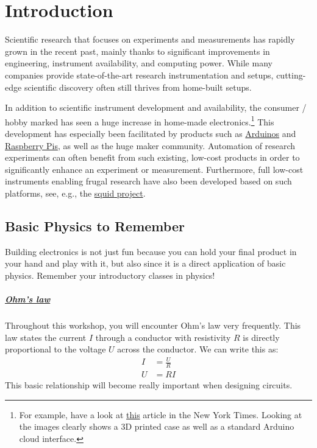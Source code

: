 
\chapter{Introduction}

Scientific research that focuses on experiments and measurements has rapidly grown in the recent past, mainly thanks to significant improvements in engineering, instrument availability, and computing power. While many companies provide state-of-the-art research instrumentation and setups, cutting-edge scientific discovery often still thrives from home-built setups. 

In addition to scientific instrument development and availability, the consumer / hobby marked has seen a huge increase in home-made electronics.\footnote{For example, have a look at \href{https://www.nytimes.com/2021/10/10/health/coronavirus-ventilation-carbon-dioxide.html}{this} article in the New York Times. Looking at the images clearly shows a 3D printed case as well as a standard Arduino cloud interface.} This development has especially been facilitated by products such as \href{https://www.arduino.cc/}{Arduinos} and \href{https://www.raspberrypi.org/}{Raspberry Pis}, as well as the huge maker community. Automation of research experiments can often benefit from such existing, low-cost products in order to significantly enhance an experiment or measurement. Furthermore, full low-cost instruments enabling frugal research have also been developed based on such platforms, see, e.g., the \href{https://squid-imaging.org/}{\ac{squid} project}.

\section{Basic Physics to Remember}

Building electronics is not just fun because you can hold your final product in your hand and play with it, but also since it is a direct application of basic physics. Remember your introductory classes in physics! 

\paragraph{\href{https://en.wikipedia.org/wiki/Ohm's_law}{Ohm's law}} Throughout this workshop, you will encounter Ohm's law very frequently. This law states the current $I$ through a conductor with resistivity $R$ is directly proportional to the voltage $U$ across the conductor. We can write this as:
\begin{align}
    I &= \frac{U}{R}\\
    U &= RI \label{eqn:uri}
\end{align}
This basic relationship will become really important when designing circuits.

